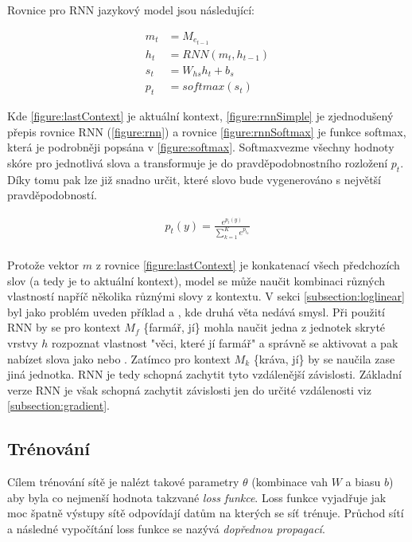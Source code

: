 Rovnice pro RNN jazykový model jsou následující:

\begin{align}
  m_{t}&=M_{e_{t-1}}\label{figure:lastContext} \\
  h_{t}&=RNN(m_t, h_{t-1}) \label{figure:rnnSimple} \\
  s_{t}&=W_{hs}h_t + b_s \label{figure:rnnSt} \\
  p_{t}&=softmax(s_t) \label{figure:rnnSoftmax}
\end{align}


Kde \ref{figure:lastContext} je aktuální kontext, \ref{figure:rnnSimple} je zjednodušený přepis rovnice RNN (\ref{figure:rnn}) a rovnice \ref{figure:rnnSoftmax} je funkce softmax, která je podrobněji popsána v \ref{figure:softmax}. Softmaxvezme všechny hodnoty skóre pro jednotlivá slova a transformuje je do pravděpodobnostního rozložení $p_t$. Díky tomu pak lze již snadno určit, které slovo bude vygenerováno s největší pravděpodobností.


\begin{align}\label{figure:softmax}
  p_t(y)={\frac {e^{p_{t}(y)}}{\sum _{k=1}^{K}e^{p_{t_{k}}}}}
\end{align}
\\


Protože vektor $m$ z rovnice \ref{figure:lastContext} je konkatenací všech předchozích slov (a tedy je to aktuální kontext), model se může naučit kombinaci různých vlastností napříč několika různými slovy z kontextu. V sekci \ref{subsection:loglinear} byl jako problém uveden příklad  a , kde druhá věta nedává smysl. Při použití RNN by se pro kontext $M_f$  \{farmář, jí\} mohla naučit jedna z jednotek skryté vrstvy $h$ rozpoznat vlastnost "věci, které jí farmář" a správně se aktivovat a pak nabízet slova jako  nebo . Zatímco pro kontext $M_k$ \{kráva, jí\} by se naučila zase jiná jednotka. RNN je tedy schopná zachytit tyto vzdálenější závislosti. Základní verze RNN je však schopná zachytit závislosti jen do určité vzdálenosti viz \ref{subsection:gradient}.


\subsection{Trénování} \label{subsection:training}
Cílem trénování sítě je nalézt takové parametry $\theta$ (kombinace vah $W$ a biasu $b$) aby byla co nejmenší hodnota takzvané \emph{loss funkce}. Loss funkce vyjadřuje jak moc špatně výstupy sítě odpovídají datům na kterých se síť trénuje. Průchod sítí a následné vypočítání loss funkce se nazývá \emph{dopřednou propagací}.


